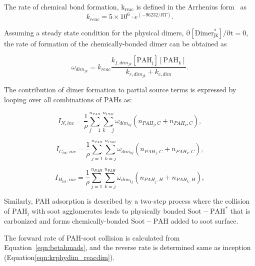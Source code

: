 The rate of chemical bond formation, $\mathrm{k_{reac}}$ is defined in the Arrhenius form~\cite{naseri2022simulating} as
\begin{equation}
	k_{reac} = 5\times10^6\cdot e^{(-96232/RT)}
	\label{eqn:kc_reacdim}.
\end{equation}

Assuming a steady state condition for the physical dimers, $\mathrm{\partial [Dimer^*_{jk}]/\partial t=0}$, the rate of formation of the chemically-bonded dimer can be obtained as

\begin{equation}
	\omega_{dim_{jk}} = k_{reac}\frac{k_{f,dim_{jk}}[\mathrm{PAH_j}][\mathrm{PAH_k}]}
	{k_{r,dim_{jk}}+k_{c,dim}}
	\label{eqn:chemdimer_reacdim}.
\end{equation}

The contribution of dimer formation to partial source terms is expressed by looping over all combinations of PAHs as:

\begin{equation}
	I_{N,{inc}} = 
	\frac{1}{\rho}
	\sum_{j=1}^{n_{PAH}} \sum_{k=j}^{n_{PAH}}  \omega_{dim_{kj}} 
	\left(
	n_{PAH_j,C}+n_{PAH_k,C}
	\right)
	\label{eqn:IN_inc},
\end{equation}

\begin{equation}
	I_{C_{tot},{inc}} = 
	\frac{1}{\rho}
	\sum_{j=1}^{n_{PAH}} \sum_{k=j}^{n_{PAH}}  \omega_{dim_{kj}} 
	\left(
	n_{PAH_j,C}+n_{PAH_k,C}
	\right)
	\label{eqn:ICtot_inc},
\end{equation}

\begin{equation}
	I_{H_{tot},{inc}} = 
	\frac{1}{\rho}
	\sum_{j=1}^{n_{PAH}} \sum_{k=j}^{n_{PAH}}  \omega_{dim_{kj}} 
	\left(
	n_{PAH_j,H}+n_{PAH_k,H}
	\right)
	\label{eqn:IHtot_inc},
\end{equation}

Similarly, PAH adsorption is described by a two-step process where the collision of $\mathrm{PAH_j}$ with soot agglomerates leads to physically bonded $\mathrm{Soot-PAH^*}$ that is carbonized and forms chemically-bonded $\mathrm{Soot-PAH}$ added to soot surface.



The forward rate of PAH-soot collision is calculated from Equation~\eqref{eqn:betahmads}, and the reverse rate is determined same as inception (Equation\eqref{eqn:krphydim_reacdim}).

